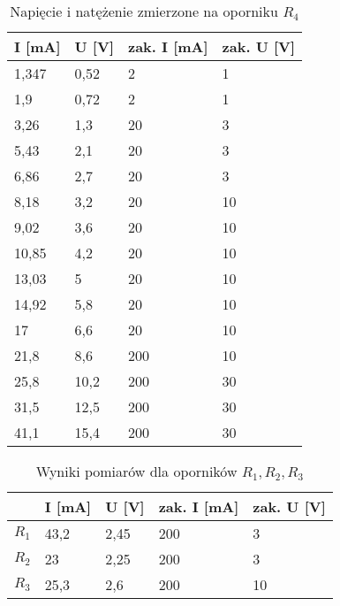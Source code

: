 \documentclass{article}
\begin{document}
\begin{table}[h!]
\centering
\begin{tabular}{|l|l|l|l|}
\hline
I {[}mA{]} & U {[}V{]} & zak. I {[}mA{]} & zak. U {[}V{]} \\ \hline
1,347      & 0,52      & 2               & 1              \\ \hline
1,9        & 0,72      & 2               & 1              \\ \hline
3,26       & 1,3       & 20              & 3              \\ \hline
5,43       & 2,1       & 20              & 3              \\ \hline
6,86       & 2,7       & 20              & 3              \\ \hline
8,18       & 3,2       & 20              & 10             \\ \hline
9,02       & 3,6       & 20              & 10             \\ \hline
10,85      & 4,2       & 20              & 10             \\ \hline
13,03      & 5         & 20              & 10             \\ \hline
14,92      & 5,8       & 20              & 10             \\ \hline
17         & 6,6       & 20              & 10             \\ \hline
21,8       & 8,6       & 200             & 10             \\ \hline
25,8       & 10,2      & 200             & 30             \\ \hline
31,5       & 12,5      & 200             & 30             \\ \hline
41,1       & 15,4      & 200             & 30             \\ \hline
\end{tabular}
\caption{Napięcie i natężenie zmierzone na oporniku $ R_4 $}
\end{table}

\begin{table}[h!]
\centering
\begin{tabular}{l|l|l|l|l|}
\cline{2-5}
                         & I {[}mA{]} & U {[}V{]} & zak. I {[}mA{]} & zak. U {[}V{]} \\ \hline
\multicolumn{1}{|l|}{$ R_1 $} & 43,2       & 2,45      & 200             & 3              \\ \hline
\multicolumn{1}{|l|}{$ R_2 $} & 23         & 2,25      & 200             & 3              \\ \hline
\multicolumn{1}{|l|}{$ R_3 $} & 25,3       & 2,6       & 200             & 10             \\ \hline
\end{tabular}
\caption{Wyniki pomiarów dla oporników $ R_1, R_2, R_3 $ }
\end{table}
\end{document}
